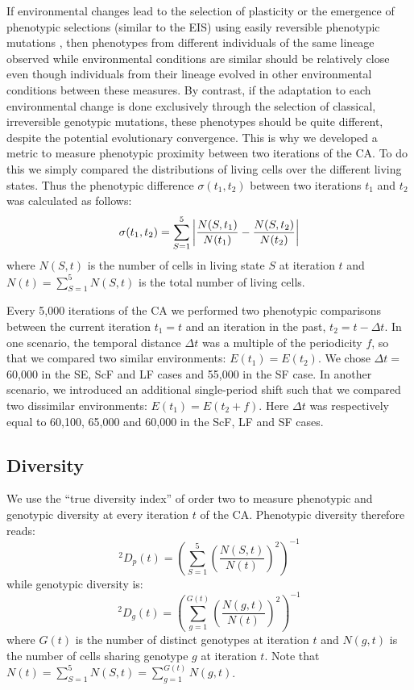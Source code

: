 If environmental changes lead to the selection of plasticity or the emergence of phenotypic selections (similar to the EIS) using easily reversible phenotypic mutations \citep{jablonka2014evolution}, then phenotypes from different individuals of the same lineage observed while environmental conditions are similar should be relatively close even though individuals from their lineage evolved in other environmental conditions between these measures. By contrast, if the adaptation to each environmental change is done exclusively through the selection of classical, irreversible genotypic mutations, these phenotypes should be quite different, despite the potential evolutionary convergence. This is why we developed a metric to measure phenotypic proximity between two iterations of the CA. To do this we simply compared the distributions of living cells over the different living states. Thus the phenotypic difference $\sigma(t_1,t_2)$ between two iterations $t_1$ and $t_2$ was calculated as follows:
%
$$\sigma(t_1,t_2) = \sum_{S=1}^5 \left| \frac{N(S,t_1)}{N(t_1)}-\frac{N(S,t_2)}{N(t_2)}\right|$$ 
%
where $N(S,t)$ is the number of cells in living state $S$ at iteration $t$ and $N(t)=\sum_{S=1}^5 N(S,t)$ is the total number of living cells.

Every 5,000 iterations of the CA we performed two phenotypic comparisons between the current iteration $t_1 = t$ and an iteration in the past, $t_2 = t - \Delta t$. In one scenario, the temporal distance $\Delta t$ was a multiple of the periodicity $f$, so that we compared two similar environments: $E(t_1) = E(t_2)$. We chose $\Delta t =$ 60,000 in the SE, ScF and LF cases and 55,000 in the SF case. In another scenario, we introduced an additional single-period shift such that we compared two dissimilar environments: $E(t_1) = E(t_2 + f)$. Here $\Delta t$ was respectively equal to 60,100, 65,000 and 60,000 in the ScF, LF and SF cases.

\subsection{Diversity}

We use the ``true diversity index'' of order two \citep{jost2006entropy} to measure phenotypic and genotypic diversity at every iteration $t$ of the CA. Phenotypic diversity therefore reads:
%
$$^2\!D_p(t)=\left(\sum_{S=1}^5 \left(\frac{N(S,t)}{N(t)}\right)^2\right)^{-1}$$
%
while genotypic diversity is:
%
$$^2\!D_g(t)=\left(\sum_{g=1}^{G(t)} \left(\frac{N(g,t)}{N(t)}\right)^2\right)^{-1}$$
%
where $G(t)$ is the number of distinct genotypes at iteration $t$ and $N(g,t)$ is the number of cells sharing genotype $g$ at iteration $t$. Note that $N(t)=\sum_{S=1}^5 N(S,t)=\sum_{g=1}^{G(t)} N(g,t)$.

